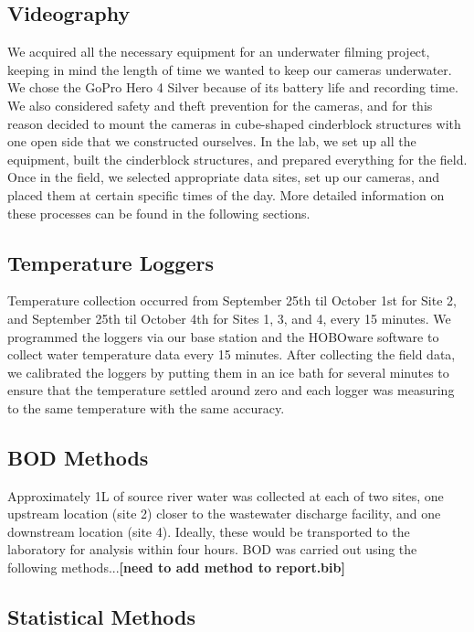 \documentclass{article}\usepackage[]{graphicx}\usepackage[]{color}
\begin{document}
\subsection{Videography}

We acquired all the necessary equipment for an underwater filming project, keeping in mind the length of time we wanted to keep our cameras underwater. We chose the GoPro Hero 4 Silver because of its battery life and recording time. We also considered safety and theft prevention for the cameras, and for this reason decided to mount the cameras in cube-shaped cinderblock structures with one open side that we constructed ourselves. In the lab, we set up all the equipment, built the cinderblock structures, and prepared everything for the field. Once in the field, we selected appropriate data sites, set up our cameras, and placed them at certain specific times of the day. More detailed information on these processes can be found in the following sections.

\subsection{Temperature Loggers}

Temperature collection occurred from September 25th til October 1st for Site 2, and September 25th til October 4th for Sites 1, 3, and 4, every 15 minutes. We programmed the loggers via our base station and the HOBOware software to collect water temperature data every 15 minutes. After collecting the field data, we calibrated the loggers by putting them in an ice bath for several minutes to ensure that the temperature settled around zero and each logger was measuring to the same temperature with the same accuracy.

\subsection{BOD Methods}

Approximately 1L of source river water was collected at each of two sites, one upstream location (site 2) closer to the wastewater discharge facility, and one downstream location (site 4). Ideally, these would be transported to the laboratory for analysis within four hours. BOD was carried out using the following methods...\textbf{[need to add method to report.bib]}

\subsection{Statistical Methods}
\end{document}
